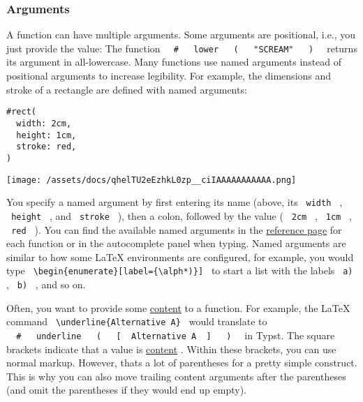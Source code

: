 \subsubsection{Arguments}\label{arguments}

A function can have multiple arguments. Some arguments are positional,
i.e., you just provide the value: The function
\texttt{\ }{\texttt{\ \#\ }}\texttt{\ }{\texttt{\ lower\ }}\texttt{\ }{\texttt{\ (\ }}\texttt{\ }{\texttt{\ "SCREAM"\ }}\texttt{\ }{\texttt{\ )\ }}\texttt{\ }
returns its argument in all-lowercase. Many functions use named
arguments instead of positional arguments to increase legibility. For
example, the dimensions and stroke of a rectangle are defined with named
arguments:

\begin{verbatim}
#rect(
  width: 2cm,
  height: 1cm,
  stroke: red,
)
\end{verbatim}

\texttt{[image: /assets/docs/qhelTU2eEzhkL0zp\_\_ciIAAAAAAAAAAA.png]}

You specify a named argument by first entering its name (above,
it\textquotesingle s \texttt{\ width\ } , \texttt{\ height\ } , and
\texttt{\ stroke\ } ), then a colon, followed by the value (
\texttt{\ 2cm\ } , \texttt{\ 1cm\ } , \texttt{\ red\ } ). You can find
the available named arguments in the \href{/docs/reference/}{reference
page} for each function or in the autocomplete panel when typing. Named
arguments are similar to how some LaTeX environments are configured, for
example, you would type
\texttt{\ \textbackslash{}begin\{enumerate\}{[}label=\{\textbackslash{}alph*)\}{]}\ }
to start a list with the labels \texttt{\ a)\ } , \texttt{\ b)\ } , and
so on.

Often, you want to provide some
\href{/docs/reference/foundations/content/}{content} to a function. For
example, the LaTeX command
\texttt{\ \textbackslash{}underline\{Alternative\ A\}\ } would translate
to
\texttt{\ }{\texttt{\ \#\ }}\texttt{\ }{\texttt{\ underline\ }}\texttt{\ }{\texttt{\ (\ }}\texttt{\ }{\texttt{\ {[}\ }}\texttt{\ Alternative\ A\ }{\texttt{\ {]}\ }}\texttt{\ }{\texttt{\ )\ }}\texttt{\ }
in Typst. The square brackets indicate that a value is
\href{/docs/reference/foundations/content/}{content} . Within these
brackets, you can use normal markup. However, that\textquotesingle s a
lot of parentheses for a pretty simple construct. This is why you can
also move trailing content arguments after the parentheses (and omit the
parentheses if they would end up empty).

